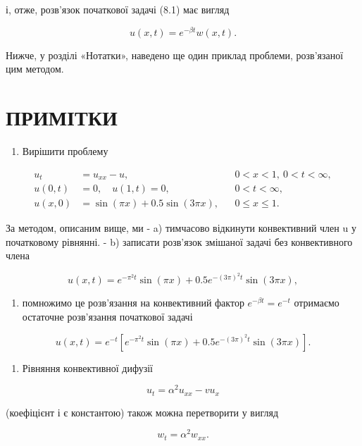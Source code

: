 \documentclass[
  ukrainian,
]{article}
\providecommand{\tightlist}{%
  \setlength{\itemsep}{0pt}\setlength{\parskip}{0pt}}
\begin{document}
і, отже, розв'язок початкової задачі (8.1) має вигляд

\[
u(x, t) = e^{-\beta t}w(x, t).
\]

Нижче, у розділі «Нотатки», наведено ще один приклад проблеми,
розв'язаної цим методом.

\section{ПРИМІТКИ}\label{ux43fux440ux438ux43cux456ux442ux43aux438}

\begin{enumerate}
\def\labelenumi{\arabic{enumi}.}
\tightlist
\item
  Вирішити проблему
\end{enumerate}

\[
\begin{aligned}
u_t &= u_{xx} - u, && 0 < x < 1,\ 0 < t < \infty, \\
u(0,t) &= 0,\quad u(1,t) = 0, && 0 < t < \infty, \\
u(x,0) &= \sin(\pi x) + 0.5\sin(3\pi x), && 0 \leqslant x \leqslant 1.
\end{aligned}
\]

За методом, описаним вище, ми - a) тимчасово відкинути конвективний член
u у початковому рівнянні. - b) записати розв'язок змішаної задачі без
конвективного члена

\[
u(x, t) = e^{-\pi^2 t} \sin(\pi x) + 0.5e^{-(3\pi)^2 t} \sin(3\pi x),
\]

\begin{enumerate}
\def\labelenumi{\alph{enumi})}
\setcounter{enumi}{2}
\tightlist
\item
  помножимо це розв'язання на конвективний фактор
  \(e^{-\beta t}=e^{-t}\) отримаємо остаточне розв'язання початкової
  задачі
\end{enumerate}

\[
u(x, t) = e^{-t} \left[ e^{-\pi^2 t} \sin(\pi x) + 0.5e^{-(3\pi)^2 t} \sin(3\pi x) \right].
\]

\begin{enumerate}
\def\labelenumi{\arabic{enumi}.}
\setcounter{enumi}{1}
\tightlist
\item
  Рівняння конвективної дифузії
\end{enumerate}

\[
u_t = \alpha^2 u_{xx} - v u_x
\]

(коефіцієнт і є константою) також можна перетворити у вигляд

\[
w_t = \alpha^2 w_{xx}.
\]
\end{document}
